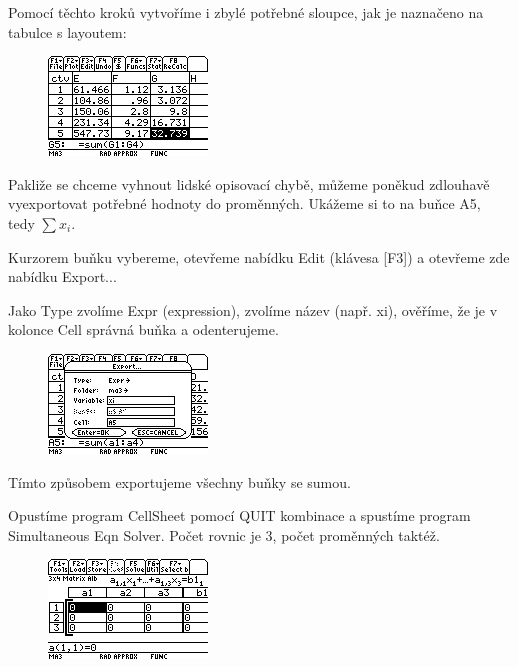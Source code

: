 \documentclass[10pt,a4paper,float]{article}
\begin{document}
Pomocí těchto kroků vytvoříme i zbylé potřebné sloupce, jak je naznačeno na tabulce s layoutem:

\begin{figure}[H]
	\centering
	\includegraphics[width=.5\textwidth]{img/CTVERCE7.PNG}
\end{figure}

\pagebreak

Pakliže se chceme vyhnout lidské opisovací chybě, můžeme poněkud zdlouhavě vyexportovat potřebné hodnoty do proměnných. Ukážeme si to na buňce A5, tedy $\sum x_i$.

Kurzorem buňku vybereme, otevřeme nabídku Edit (klávesa [F3]) a otevřeme zde nabídku Export...

Jako Type zvolíme Expr (expression), zvolíme název (např. xi), ověříme, že je v kolonce Cell správná buňka a odenterujeme.

\begin{figure}[H]
	\centering
	\includegraphics[width=.5\textwidth]{img/CTVERCE8.PNG}
\end{figure}

Tímto způsobem exportujeme všechny buňky se sumou.

Opustíme program CellSheet pomocí QUIT kombinace a spustíme program Simultaneous Eqn Solver. Počet rovnic je 3, počet proměnných taktéž.

\begin{figure}[H]
	\centering
	\includegraphics[width=.5\textwidth]{img/CTVERCE9.PNG}
\end{figure}
\end{document}
